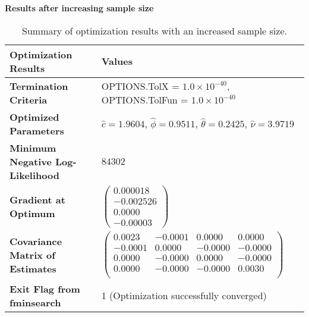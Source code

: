 \documentclass[12pt]{article}
\begin{document}
\textbf{Results after increasing sample size}
\begin{table}[h!]
\centering
\begin{tabular}{|l|l|}
\hline
\textbf{Optimization Results}              & \textbf{Values}                                                                 \\ \hline
\textbf{Termination Criteria}              & OPTIONS.TolX = $1.0 \times 10^{-40}$, OPTIONS.TolFun = $1.0 \times 10^{-40}$     \\ \hline
\textbf{Optimized Parameters}              & $\hat{c} = 1.9604$, $\hat{\phi} = 0.9511$, $\hat{\theta} = 0.2425$, $\hat{\nu} = 3.9719$ \\ \hline
\textbf{Minimum Negative Log-Likelihood}   & $84302$                                                                         \\ \hline
\textbf{Gradient at Optimum}               & $\begin{pmatrix}
0.000018 \\
-0.002526 \\
0.0000 \\
-0.00003
\end{pmatrix}$                                                                  \\ \hline
\textbf{Covariance Matrix of Estimates}    & $\begin{pmatrix}
0.0023 & -0.0001 & 0.0000 & 0.0000 \\
-0.0001 & 0.0000 & -0.0000 & -0.0000 \\
0.0000 & -0.0000 & 0.0000 & -0.0000 \\
0.0000 & -0.0000 & -0.0000 & 0.0030 \\
\end{pmatrix}$                                                                \\ \hline
\textbf{Exit Flag from fminsearch}         & 1 (Optimization successfully converged)                                         \\ \hline
\end{tabular}
\caption{Summary of optimization results with an increased sample size.}
\label{tab:optimization_large_sample}
\end{table}
\end{document}
